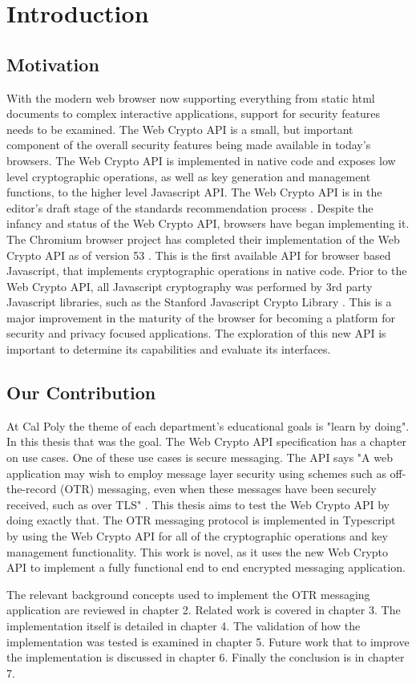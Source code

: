 \chapter{Introduction}


\section{Motivation}


With the modern web browser now supporting everything from static html documents to complex interactive applications, support for security features needs to be examined. The Web Crypto API is a small, but important component of the overall security features being made available in today's browsers. The Web Crypto API is implemented in native code and exposes low level cryptographic operations, as well as key generation and management functions, to the higher level Javascript API. The Web Crypto API is in the editor's draft stage of the standards recommendation process \cite{webcrypto-overview}. Despite the infancy and status of the Web Crypto API, browsers have began implementing it. The Chromium browser project has completed their implementation of the Web Crypto API as of version 53 \cite{webcrypto-chromium}. This is the first available API for browser based Javascript, that implements cryptographic operations in native code. Prior to the Web Crypto API, all Javascript cryptography was performed by 3rd party Javascript libraries, such as the Stanford Javascript Crypto Library \cite{sjcl-library}. This is a major improvement in the maturity of the browser for becoming a platform for security and privacy focused applications. The exploration of this new API is important to determine its capabilities and evaluate its interfaces.


\section{Our Contribution}


At Cal Poly the theme of each department's educational goals is "learn by doing". In this thesis that was the goal. The Web Crypto API specification has a chapter on use cases. One of these use cases is secure messaging. The API says "A web application may wish to employ message layer security using schemes such as off-the-record (OTR) messaging, even when these messages have been securely received, such as over TLS" \cite{webcrypto-overview}. This thesis aims to test the Web Crypto API by doing exactly that. The OTR messaging protocol is implemented in Typescript by using the Web Crypto API for all of the cryptographic operations and key management functionality. This work is novel, as it uses the new Web Crypto API to implement a fully functional end to end encrypted messaging application.  

The relevant background concepts used to implement the OTR messaging application are reviewed in chapter 2. Related work is covered in chapter 3. The implementation itself is detailed in chapter 4. The validation of how the implementation was tested is examined in chapter 5. Future work that to improve the implementation is discussed in chapter 6. Finally the conclusion is in chapter 7.
